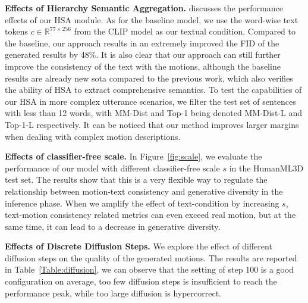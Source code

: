 \documentclass[letterpaper]{article} \usepackage{aaai24}
\begin{document}
\noindent\textbf{Effects of Hierarchy Semantic Aggregation.}  discusses the performance effects of our HSA module. As for the baseline model, we use the word-wise text tokens 
$c \in \mathbb{R}^{77 \times 256}$ from the CLIP model as our textual condition. Compared to the baseline, our approach results in an extremely improved the FID of the generated results by 48\%. It is also clear that our approach can still further improve the consistency of the text with the motions, although the baseline results are already new sota compared to the previous work, which  also verifies the ability of HSA to extract comprehensive semantics. To test the capabilities of our HSA in more complex utterance scenarios, we filter the test set of sentences with less than 12 words, with MM-Dist and Top-1 being denoted MM-Dist-L and Top-1-L respectively. It can be noticed that our method improves larger margins when dealing with complex motion descriptions.

\noindent\textbf{Effects of classifier-free scale.} In Figure~\ref{fig:scale}, we evaluate the performance of our model with different classifier-free scale $s$ in the HumanML3D test set. The results show that this is a very flexible way to regulate the relationship between motion-text consistency and generative diversity in the inference phase. When we amplify the effect of text-condition by increasing $s$, text-motion consistency related metrics can even exceed real motion, but at the same time, it can lead to a decrease in generative diversity. 

\noindent\textbf{Effects of Discrete Diffusion Steps.} We explore the effect of different diffusion steps on the quality of the generated motions. The results are reported in Table~\ref{Table:diffusion}, we can observe that the setting of step 100 is a good configuration on average, too few diffusion steps is insufficient to reach the performance peak, while too large diffusion is hypercorrect.
\end{document}
